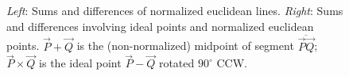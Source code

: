 \documentclass[12pt]{article}
\begin{document}
  \begin{figure}[b]
   \centering
{\setlength\fboxsep{0pt}\hspace{.1in}
{\setlength\fboxsep{0pt}}}%
\caption{\emph{Left}: Sums and differences of normalized euclidean lines.  \emph{Right}: Sums and differences involving ideal points and normalized euclidean points. $\vec{P}  + \vec{Q}$ is the (non-normalized) midpoint of segment $\overline{\vec{P}\vec{Q}}$; $\vec{P}\times\vec{Q}$ is the ideal point $\vec{P}-\vec{Q}$ rotated $90^\circ$ CCW.}
\label{fig:sumdiff}
\end{figure}

\end{document}
